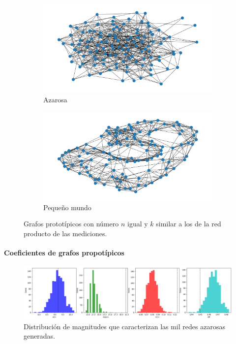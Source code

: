 \documentclass{article}
\begin{document}
\begin{figure}[ht]
	\centering
	\begin{subfigure}[b]{0.32\textwidth}
		\includegraphics[width= \linewidth]{erdos_renyi}
		\caption{Azarosa}
		\label{fg:erdos_renyi}
	\end{subfigure}
	\begin{subfigure}[b]{0.32\textwidth}
		\includegraphics[width= \linewidth]{watts_strogatz}
		\caption{Pequeño mundo}
		\label{fg:watts_strogatz}
	\end{subfigure}
	\caption{Grafos prototípicos con número $n$ igual y $k$ similar a los de la red producto de las mediciones. 
	}
	\label{fg:prototípicas}
\end{figure}



\paragraph{Coeficientes de grafos propotípicos}

\begin{figure}[ht]
  \centering
  \includegraphics[width= \linewidth]{hist_poisson}
  \caption{Distribución de magnitudes que caracterizan las mil redes azarosas generadas.}
	\label{fg:hist_poisson}
\end{figure}




\printbibliography[title= Referencias, heading=bibintoc]
\end{document}
